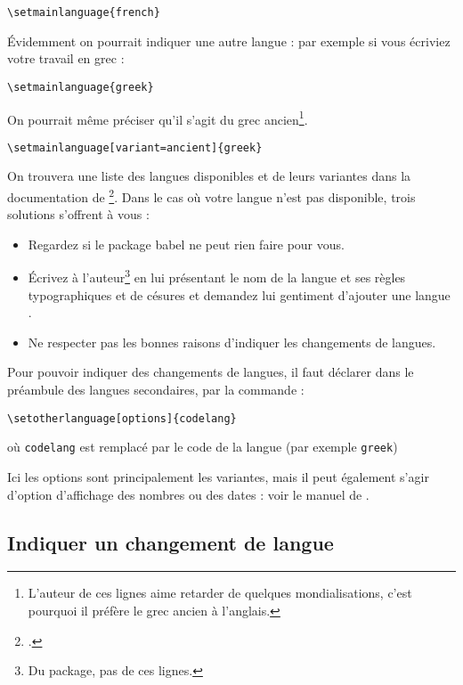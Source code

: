 \begin{verbatim}
\setmainlanguage{french}
\end{verbatim}

Évidemment on pourrait indiquer une autre langue :  par exemple si vous écriviez votre travail en grec :

\begin{verbatim}
\setmainlanguage{greek}
\end{verbatim}

On pourrait même préciser qu'il s'agit du grec ancien\footnote{L'auteur de ces lignes aime retarder de quelques mondialisations, c'est pourquoi il préfère le grec ancien à l'anglais.}.

\begin{verbatim}
\setmainlanguage[variant=ancient]{greek}
\end{verbatim}


On trouvera une liste des langues disponibles et de leurs variantes dans la documentation de \footcite{polyglossia}. Dans le cas où votre langue n'est pas disponible, trois solutions s'offrent à vous :
\begin{itemize}
\item Regardez si le package babel ne peut rien faire pour vous. 
\item Écrivez à l'auteur\footnote{Du package, pas de ces lignes.} en lui présentant le nom de la langue et ses règles typographiques et de césures et demandez lui gentiment d'ajouter une langue .
\item Ne respecter pas les bonnes raisons d'indiquer les changements de langues.
\end{itemize}

Pour pouvoir indiquer des changements de langues, il faut déclarer dans le préambule des langues secondaires, par la commande :

\begin{verbatim}
\setotherlanguage[options]{codelang}
\end{verbatim}

où \verb|codelang| est remplacé par le code de la langue (par exemple \verb|greek|)

Ici les options sont principalement les variantes, mais il peut également s'agir d'option d'affichage des nombres ou des dates : voir le manuel de .

\subsection{Indiquer un changement de langue}

